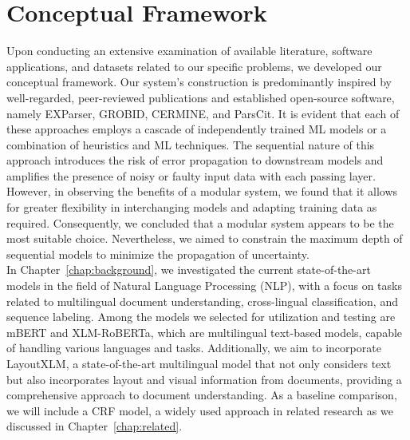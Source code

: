 \section{Conceptual Framework}\label{sec:conceptual_framework}
Upon conducting an extensive examination of available literature, software applications, and datasets related to our specific problems, we developed our conceptual framework. Our system's construction is predominantly inspired by well-regarded, peer-reviewed publications and established open-source software, namely EXParser, GROBID, CERMINE, and ParsCit. It is evident that each of these approaches employs a cascade of independently trained ML models or a combination of heuristics and ML techniques. The sequential nature of this approach introduces the risk of error propagation to downstream models and amplifies the presence of noisy or faulty input data with each passing layer.\\
However, in observing the benefits of a modular system, we found that it allows for greater flexibility in interchanging models and adapting training data as required. Consequently, we concluded that a modular system appears to be the most suitable choice. Nevertheless, we aimed to constrain the maximum depth of sequential models to minimize the propagation of uncertainty.\\
In Chapter~\ref{chap:background}, we investigated the current state-of-the-art models in the field of Natural Language Processing (NLP), with a focus on tasks related to multilingual document understanding, cross-lingual classification, and sequence labeling. Among the models we selected for utilization and testing are mBERT and XLM-RoBERTa, which are multilingual text-based models, capable of handling various languages and tasks. Additionally, we aim to incorporate LayoutXLM, a state-of-the-art multilingual model that not only considers text but also incorporates layout and visual information from documents, providing a comprehensive approach to document understanding. As a baseline comparison, we will include a CRF model, a widely used approach in related research as we discussed in Chapter~\ref{chap:related}.

